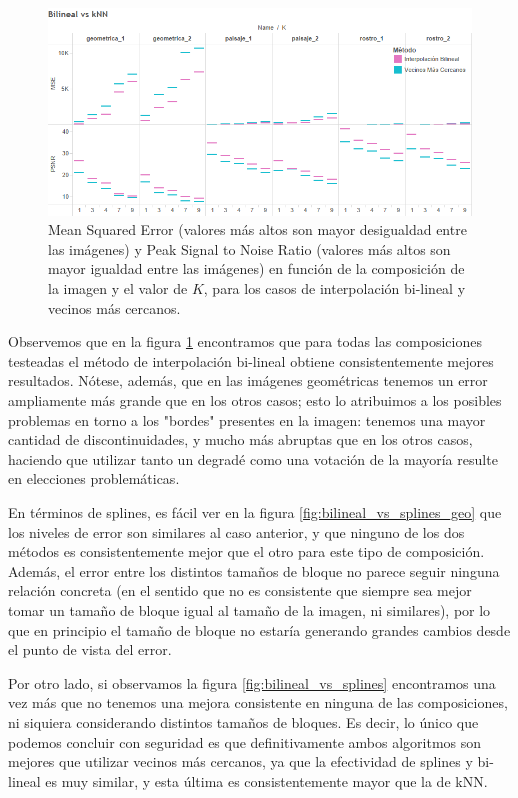 \documentclass{article}
\begin{document}
\begin{figure}[H]
\centering
\includegraphics[width=17cm]{Bilineal vs kNN}
\caption{Mean Squared Error (valores más altos son mayor desigualdad entre las imágenes) y Peak Signal to Noise Ratio (valores más altos son mayor igualdad entre las imágenes) en función de la composición de la imagen y el valor de $K$, para los casos de interpolación bi-lineal y vecinos más cercanos.}
\label{fig:bilineal_vs_knn}
\end{figure}

Observemos que en la figura \ref{fig:bilineal_vs_knn} encontramos que para todas las composiciones testeadas el método de interpolación bi-lineal obtiene consistentemente mejores resultados. Nótese, además, que en las imágenes geométricas tenemos un error ampliamente más grande que en los otros casos; esto lo atribuimos a los posibles problemas en torno a los "bordes" presentes en la imagen: tenemos una mayor cantidad de discontinuidades, y mucho más abruptas que en los otros casos, haciendo que utilizar tanto un degradé como una votación de la mayoría resulte en elecciones problemáticas.

En términos de splines, es fácil ver en la figura \ref{fig:bilineal_vs_splines_geo} que los niveles de error son similares al caso anterior, y que ninguno de los dos métodos es consistentemente mejor que el otro para este tipo de composición. Además, el error entre los distintos tamaños de bloque no parece seguir ninguna relación concreta (en el sentido que no es consistente que siempre sea mejor tomar un tamaño de bloque igual al tamaño de la imagen, ni similares), por lo que en principio el tamaño de bloque no estaría generando grandes cambios desde el punto de vista del error.

Por otro lado, si observamos la figura \ref{fig:bilineal_vs_splines} encontramos una vez más que no tenemos una mejora consistente en ninguna de las composiciones, ni siquiera considerando distintos tamaños de bloques. Es decir, lo único que podemos concluir con seguridad es que definitivamente ambos algoritmos son mejores que utilizar vecinos más cercanos, ya que la efectividad de splines y bi-lineal es muy similar, y esta última es consistentemente mayor que la de kNN.
\end{document}
